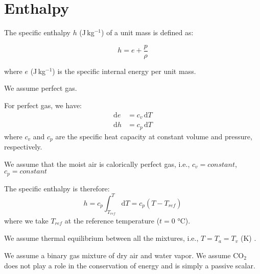 \section*{Enthalpy}

The specific enthalpy $h$ (J\,kg$^{-1}$) of a unit mass is defined as:

\begin{equation}
h = e + \frac{p}{\rho}
\end{equation}

where $e$ (J\,kg$^{-1}$) is the specific internal energy per unit mass. 

\begin{assumption}
	We assume perfect gas.
\end{assumption}

For perfect gas, we have:
\begin{align}
\mathrm{d}e &= c_v \,\mathrm{d}T\\
\mathrm{d}h &= c_p \,\mathrm{d}T
\end{align}
where $c_v$ and $c_p$ are the specific heat capacity at constant volume and pressure, respectively.
\begin{assumption}
	We assume that the moist air is calorically perfect gas, i.e., $c_v=\textit{constant}$, $c_p=\textit{constant}$
\end{assumption}
The specific enthalpy is therefore:
\begin{equation}
h = c_p \int^T_{T_{\textit{ref}}} \mathrm{d}T = c_p \left(T - T_{\textit{ref}}\right)
\end{equation}
where we take $T_{\textit{ref}}$ at the reference temperature ($t=0$ \si{\degreeCelsius}).

\begin{assumption}
	We assume thermal equilibrium between all the mixtures, i.e., $T = T_a = T_v$ (K) \citep{Defraeye2011}.
\end{assumption}

\begin{assumption}
	We assume a binary gas mixture of dry air and water vapor. We assume CO$_2$ does not play a role in the conservation of energy and is simply a passive scalar.
\end{assumption}


